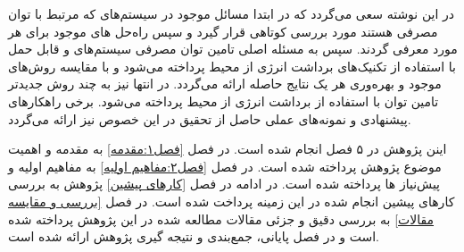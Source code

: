 در این نوشته سعی می‌گردد که در ابتدا مسائل موجود در سیستم‌های  که مرتبط با توان مصرفی هستند مورد بررسی کوتاهی قرار گیرد و سپس راه‌حل های موجود برای هر مورد معرفی گردند. سپس به مسئله اصلی تامین توان مصرفی سیستم‌های  و قابل حمل با استفاده از تکنیک‌های برداشت انرژی از محیط پرداخته می‌شود و با مقایسه روش‌های موجود و بهره‌وری هر یک نتایج حاصله ارائه می‌گردد. در انتها نیز به چند روش جدیدتر تامین توان با استفاده از برداشت انرژی از محیط پرداخته می‌شود. برخی راهکارهای پیشنهادی و نمونه‌های عملی حاصل از تحقیق در این خصوص نیز ارائه می‌گردد.


	
اینن پژوهش در ۵ فصل انجام شده است. در فصل \ref{فصل۱:مقدمه} به مقدمه و اهمیت موضوع پژوهش پرداخته شده است. در فصل \ref{فصل۲:مفاهیم اولیه} به مفاهیم اولیه و پیش‌نیاز ها پرداخته شده است. در ادامه در فصل \ref{کارهای پیشین} پژوهش به بررسی کار‌های پیشین انجام شده در این زمینه پرداخت شده است. در فصل \ref{بررسی و مقایسه مقالات} به بررسی دقیق و جزئی مقالات مطالعه شده در این پژوهش پرداخته شده است و در فصل پایانی، جمع‌بندی و نتیجه گیری پژوهش ارائه شده است.